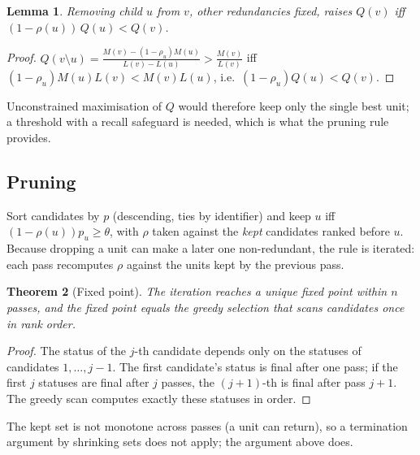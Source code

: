 \documentclass[10pt,twocolumn]{article}
\newtheorem{theorem}{Theorem}
\newtheorem{lemma}[theorem]{Lemma}
\theoremstyle{definition}
\theoremstyle{remark}
\begin{document}
\begin{lemma}
Removing child $u$ from $v$, other redundancies fixed, raises $Q(v)$ iff $(1-\rho(u))\,Q(u)<Q(v)$.
\end{lemma}
\begin{proof}
$Q(v\setminus u)=\frac{M(v)-(1-\rho_u)M(u)}{L(v)-L(u)}>\frac{M(v)}{L(v)}$ iff $(1-\rho_u)M(u)L(v)<M(v)L(u)$, i.e.\ $(1-\rho_u)Q(u)<Q(v)$.
\end{proof}
Unconstrained maximisation of $Q$ would therefore keep only the single best unit; a threshold with a recall safeguard is needed, which is what the pruning rule provides.

\subsection{Pruning}
Sort candidates by $p$ (descending, ties by identifier) and keep $u$ iff $(1-\rho(u))p_u\ge\theta$, with $\rho$ taken against the \emph{kept} candidates ranked before $u$.
Because dropping a unit can make a later one non-redundant, the rule is iterated: each pass recomputes $\rho$ against the units kept by the previous pass.

\begin{theorem}[Fixed point]\label{thm:fixed}
The iteration reaches a unique fixed point within $n$ passes, and the fixed point equals the greedy selection that scans candidates once in rank order.
\end{theorem}
\begin{proof}
The status of the $j$-th candidate depends only on the statuses of candidates $1,\dots,j-1$. The first candidate's status is final after one pass; if the first $j$ statuses are final after $j$ passes, the $(j+1)$-th is final after pass $j+1$. The greedy scan computes exactly these statuses in order.
\end{proof}
The kept set is not monotone across passes (a unit can return), so a termination argument by shrinking sets does not apply; the argument above does.
\end{document}
